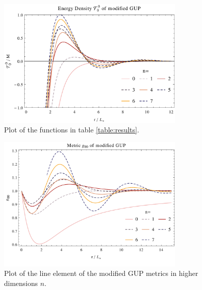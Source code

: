 \documentclass[10pt,a4paper]{article}
\begin{document}
\begin{figure}
\includegraphics[width=0.8\textwidth]{plot/matter-density.pdf}
\caption{Plot of the functions in table \ref{table:results}.}\label{fig:results-plot}
\end{figure}

\begin{figure}
\includegraphics[width=0.8\textwidth]{plot/g00.pdf}
\caption{Plot of the line element of the modified GUP metrics in higher dimensions $n$.}\label{fig:g00}
\end{figure}
\end{document}
